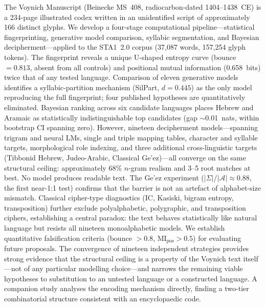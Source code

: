 
The Voynich Manuscript (Beinecke MS~408, radiocarbon-dated 1404--1438~CE) is a 234-page illustrated codex written in an unidentified script of approximately 166 distinct glyphs.  We develop a four-stage computational pipeline---statistical fingerprinting, generative model comparison, syllabic segmentation, and Bayesian decipherment---applied to the STA1~2.0 corpus (37,087 words, 157,254 glyph tokens).  The fingerprint reveals a unique U-shaped entropy curve (bounce $= 0.813$, absent from all controls) and positional mutual information (0.658~bits) twice that of any tested language.  Comparison of eleven generative models identifies a syllabic-partition mechanism (SilPart, $d = 0.445$) as the only model reproducing the full fingerprint; four published hypotheses are quantitatively eliminated.  Bayesian ranking across six candidate languages places Hebrew and Aramaic as statistically indistinguishable top candidates (gap $\sim$0.01~nats, within bootstrap CI spanning zero).  However, nineteen decipherment models---spanning trigram and neural LMs, single and triple mapping tables, character and syllable targets, morphological role indexing, and three additional cross-linguistic targets (Tibbonid Hebrew, Judeo-Arabic, Classical Ge'ez)---all converge on the same structural ceiling: approximately 68\% $n$-gram realism and 3--5 root matches at best.  No model produces readable text.  The Ge'ez experiment ($|\Sigma|/|\mathcal{A}| \approx 0.88$, the first near-1:1 test) confirms that the barrier is not an artefact of alphabet-size mismatch.  Classical cipher-type diagnostics (IC, Kasiski, bigram entropy, transposition) further exclude polyalphabetic, polygraphic, and transposition ciphers, establishing a central paradox: the text behaves statistically like natural language but resists all nineteen monoalphabetic models.  We establish quantitative falsification criteria (bounce $> 0.8$, MI$_{\text{pos}} > 0.5$) for evaluating future proposals.  The convergence of nineteen independent strategies provides strong evidence that the structural ceiling is a property of the Voynich text itself---not of any particular modelling choice---and narrows the remaining viable hypotheses to substitution to an untested language or a constructed language.  A companion study analyses the encoding mechanism directly, finding a two-tier combinatorial structure consistent with an encyclopaedic code.
